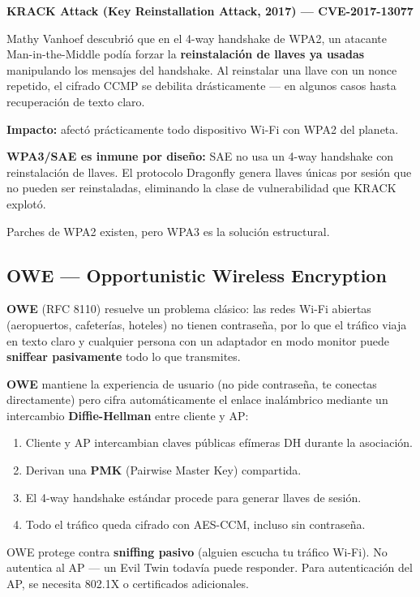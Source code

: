 \begin{cuidado}
\textbf{KRACK Attack (Key Reinstallation Attack, 2017) --- CVE-2017-13077}

Mathy Vanhoef descubrió que en el 4-way handshake de WPA2, un atacante
Man-in-the-Middle podía forzar la \textbf{reinstalación de llaves ya usadas}
manipulando los mensajes del handshake. Al reinstalar una llave con un
nonce repetido, el cifrado CCMP se debilita drásticamente --- en algunos
casos hasta recuperación de texto claro.

\textbf{Impacto:} afectó prácticamente todo dispositivo Wi-Fi con WPA2 del planeta.

\textbf{WPA3/SAE es inmune por diseño:} SAE no usa un 4-way handshake con
reinstalación de llaves. El protocolo Dragonfly genera llaves únicas por sesión
que no pueden ser reinstaladas, eliminando la clase de vulnerabilidad que
KRACK explotó.

 Parches de WPA2 existen, pero WPA3 es la solución estructural.
\end{cuidado}

\subsection{ OWE --- Opportunistic Wireless Encryption}

\begin{concepto}
\textbf{OWE} (RFC 8110) resuelve un problema clásico: las redes Wi-Fi abiertas
(aeropuertos, cafeterías, hoteles) no tienen contraseña, por lo que el tráfico
viaja en texto claro y cualquier persona con un adaptador en modo monitor
puede \textbf{sniffear pasivamente} todo lo que transmites.

\textbf{OWE} mantiene la experiencia de usuario (no pide contraseña, te conectas
directamente) pero cifra automáticamente el enlace inalámbrico mediante un
intercambio \textbf{Diffie-Hellman} entre cliente y AP:

\begin{enumerate}
    \item Cliente y AP intercambian claves públicas efímeras DH durante la asociación.
    \item Derivan una \textbf{PMK} (Pairwise Master Key) compartida.
    \item El 4-way handshake estándar procede para generar llaves de sesión.
    \item Todo el tráfico queda cifrado con AES-CCM, incluso sin contraseña.
\end{enumerate}

 OWE protege contra \textbf{sniffing pasivo} (alguien escucha tu
tráfico Wi-Fi). No autentica al AP --- un Evil Twin todavía puede responder.
Para autenticación del AP, se necesita 802.1X o certificados adicionales.
\end{concepto}

